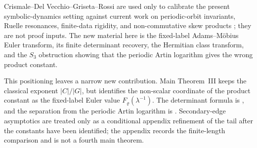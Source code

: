 \documentclass[11pt,a4paper]{amsart}
\theoremstyle{plain}
\theoremstyle{definition}
\theoremstyle{remark}
\begin{document}
Crismale--Del Vecchio--Griseta--Rossi are used only to calibrate the present
symbolic-dynamics setting against current work on periodic-orbit invariants,
Ruelle resonances, finite-data rigidity, and non-commutative skew products
\cite{Coles2025VassilievWritheAxiomA,Humbert2025FirstRuelleResonance,OHare2025FiniteDataRigidity,CrismaleDelVecchioGrisetaRossi2025NoncommutativeSkewProduct};
they are not proof inputs.  The new material here is the fixed-label
Adams--M\"obius Euler transform, its finite determinant recovery, the
Hermitian class transform, and the \(S_3\) obstruction showing that the
periodic Artin logarithm gives the wrong product constant.

This positioning leaves a narrow new contribution.  Main Theorem~III keeps the
classical exponent \(|C|/|G|\), but identifies the non-scalar coordinate of the
product constant as the fixed-label Euler value
\(F_\varrho(\lambda^{-1})\).  The determinant formula is
,
and the separation from the periodic Artin logarithm is
.
Secondary-edge asymptotics are treated only as a conditional appendix
refinement of the tail after the constants have been identified; the appendix
records the finite-length comparison and is not a fourth main theorem.
\end{document}
